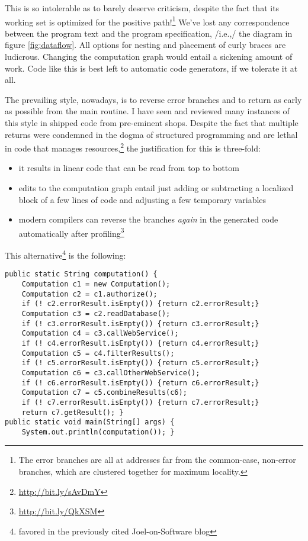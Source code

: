 \documentclass[11pt]{article}
\begin{document}
This is so intolerable as to barely deserve criticism, despite the
fact that its working set is optimized for the positive
path!\footnote{The error branches are all at addresses far from the
   common-case, non-error branches, which are clustered together for
   maximum locality.} We've lost any correspondence between the
program text and the program specification, /i.e.,/ the diagram in
figure \ref{fig:dataflow}. All options for nesting and placement of
curly braces are ludicrous. Changing the computation graph would
entail a sickening amount of work. Code like this is best left to
automatic code generators, if we tolerate it at all.

The prevailing style, nowadays, is to reverse error branches and to
return as early as possible from the main routine. I have seen and
reviewed many instances of this style in shipped code from
pre-eminent shops. Despite the fact that multiple returns were
condemned in the dogma of structured programming and are lethal in
code that manages resources,\footnote{\url{http://bit.ly/sAvDmY}} the
justification for this is three-fold:
\begin{itemize}
\item it results in linear code that can be read from top to bottom
\item edits to the computation graph entail just adding or subtracting
a localized block of a few lines of code and adjusting a few
temporary variables
\item modern compilers can reverse the branches \emph{again} in the
generated code automatically after
profiling\footnote{\url{http://bit.ly/QkXSM}}
\end{itemize}

This alternative\footnote{favored in the previously cited
   Joel-on-Software blog} is the following:

\begin{verbatim}
public static String computation() {
    Computation c1 = new Computation();
    Computation c2 = c1.authorize();
    if (! c2.errorResult.isEmpty()) {return c2.errorResult;}
    Computation c3 = c2.readDatabase();
    if (! c3.errorResult.isEmpty()) {return c3.errorResult;}
    Computation c4 = c3.callWebService();
    if (! c4.errorResult.isEmpty()) {return c4.errorResult;}
    Computation c5 = c4.filterResults();
    if (! c5.errorResult.isEmpty()) {return c5.errorResult;}
    Computation c6 = c3.callOtherWebService();
    if (! c6.errorResult.isEmpty()) {return c6.errorResult;}
    Computation c7 = c5.combineResults(c6);
    if (! c7.errorResult.isEmpty()) {return c7.errorResult;}
    return c7.getResult(); }
public static void main(String[] args) {
    System.out.println(computation()); }
\end{verbatim}
\end{document}
